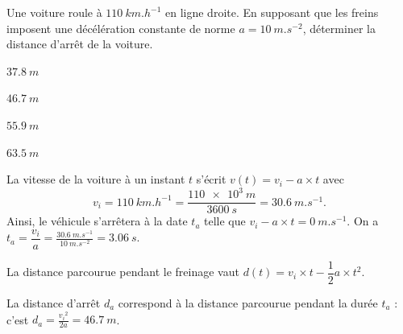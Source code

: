 
\hauteurLargeurCadreReponse		{7mm}{1.5cm}
\initialisationEntrainement


\debutEntrainement


\begin{enonce}
Une voiture roule à $\SI{110}{km.h^{-1}}$ en ligne droite. En supposant que les 
freins imposent une décélération constante de norme $a=\SI{10}{m.s^{-2}}$, 
déterminer la distance d'arrêt de la voiture. 
	\begin{listeQCM4Colonnes}
		\item $\SI{37,8}{m}$ 
		\item $\SI{46,7}{m}$ 
		\item $\SI{55,9}{m}$
		\item $\SI{63,5}{m}$  
	\end{listeQCM4Colonnes}
	\medskip
\end{enonce}

\reponse{\reponseB{}}

\begin{corrigeNewpage}
	La vitesse de la voiture à un instant $t$ s'écrit $v(t) = v_i - a \times t$ avec 
	\[
	v_i = \SI{110}{km.h^{-1}}=\frac{\SI{110e3}{m}}{\SI{3600}{s}}= \SI{30,6}{m.s^{-1}}.
	\]
	Ainsi, le véhicule s'arrêtera à la date $t_a$ telle que $v_i - a \times t = \SI{0}{m.s^{-1}}$. On a  $t_a=\dfrac{v_i}{a} =\frac{\SI{30,6}{m.s^{-1}}}{\SI{10}{m.s^{-2}}}=\SI{3,06}{s}$.
	
	La distance parcourue pendant le freinage vaut $d(t) = v_i\times t -\dfrac{1}{2}a \times t^2$. 
	
	La distance d'arrêt 
	$d_a$ correspond à la distance parcourue pendant la durée $t_a$ : c'est $d_a =\frac{{v_i}^2}{2a} =\SI{46,7}{m}$.
\end{corrigeNewpage}

